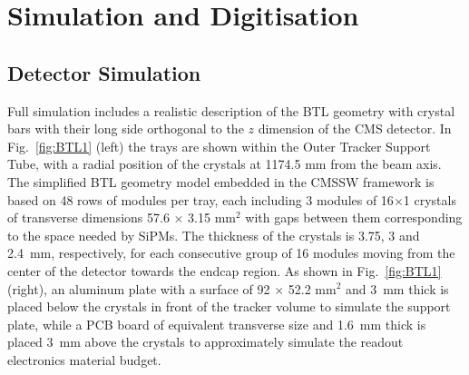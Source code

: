 \section{Simulation and Digitisation}

\subsection{Detector Simulation}


Full simulation includes a realistic description of the BTL geometry with crystal bars with their long side orthogonal to the $z$ dimension of the CMS detector. In Fig.~\ref{fig:BTL1} (left) the trays are shown within the Outer Tracker Support Tube, with a radial position of the crystals at 1174.5 mm from the beam axis. The simplified BTL geometry model embedded in the CMSSW framework is based on 48 rows of modules per tray, each including 3 modules of 16$\times$1 crystals of transverse dimensions 57.6 $\times$ 3.15 mm$^2$ with gaps between them corresponding to the space needed by SiPMs. The thickness of the crystals is 3.75, 3 and 2.4~mm, respectively, for each consecutive group of 16 modules moving from the center of the detector towards the endcap region. As shown in Fig.~\ref{fig:BTL1} (right), an aluminum plate with a surface of 92 $\times$ 52.2 mm$^2$ and 3~mm thick is placed below the crystals in front of the tracker volume to simulate the support plate, while a PCB board of equivalent transverse size and 1.6~mm thick is placed 3~mm above the crystals to approximately simulate the readout electronics material budget.

